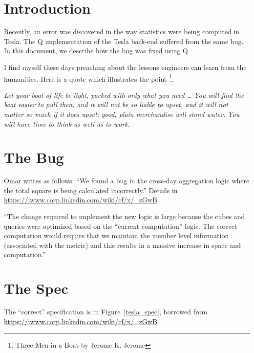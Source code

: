 \usepackage{hyperref}

\section{Introduction}

Recently, an error was discovered in the way statistics were being
computed in Tesla. 
The Q implementation of the Tesla back-end suffered from the same bug.
In this document, we describe how the bug was fixed using Q.

I find myself these days preaching about the lessons engineers can learn
from the humanities. Here is a quote which illustrates the point
\footnote{Three Men in a Boat by Jerome K. Jerome}.

{\it 
Let your boat of life be light, packed with only what you need \ldots 
You will find the boat easier to pull then, and it will not be so
liable to upset, and it will not matter so much if it does upset;
good, plain merchandise will stand water. You will have time to think
as well as to work.
}

\section{The Bug}
\label{The_Bug}

Omar writes as follows:
``We found a bug in the cross-day aggregation logic where 
the total square is being calculated incorrectly.'' Details in
\url{https://iwww.corp.linkedin.com/wiki/cf/x/_zGwB}

``The
change required to implement the new logic is large because the cubes
and queries were optimized based on the ``current computation'' logic. The
correct computation would require that we maintain the member level
information (associated with the metric) and this results in a massive
increase in space and computation.''

\section{The Spec}

The ``correct'' specification is in Figure~\ref{tesla_spec}, borrowed
from
\url{https://iwww.corp.linkedin.com/wiki/cf/x/_zGwB}


\begin{figure}
\centering
{}
\end{figure}

